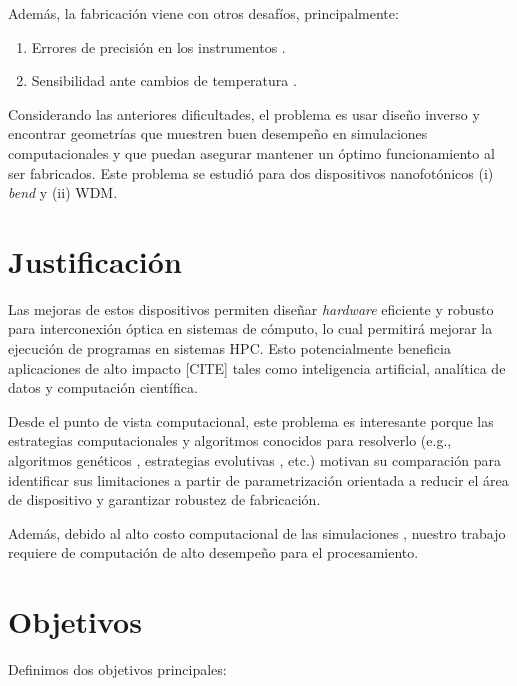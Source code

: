 Además, la fabricación viene con otros desafíos, principalmente:

\begin{enumerate}
  \item Errores de precisión en los instrumentos \citep{Piggott2017}.
  \item Sensibilidad ante cambios de temperatura \citep{Vuckovic2019}.
\end{enumerate}

Considerando las anteriores dificultades, el problema es usar diseño inverso y encontrar geometrías que muestren buen desempeño en simulaciones computacionales y que puedan asegurar mantener un óptimo funcionamiento al ser fabricados. 
Este problema se estudió para dos dispositivos nanofotónicos (i) \emph{bend} y (ii) WDM.

\section{Justificación}


Las mejoras de estos dispositivos permiten diseñar \emph{hardware} eficiente y robusto para interconexión óptica en sistemas de cómputo, lo cual permitirá mejorar la ejecución de programas en sistemas HPC. Esto potencialmente beneficia aplicaciones de alto impacto [CITE] tales como inteligencia artificial, analítica de datos y computación científica.

Desde el punto de vista computacional, 
este problema es interesante porque las estrategias computacionales y algoritmos conocidos para resolverlo
(e.g., algoritmos genéticos \citep{Mykel2019}, estrategias evolutivas \citep{Hansen2016}, etc.) motivan su comparación para identificar sus limitaciones a partir de parametrización orientada a reducir el área de dispositivo y garantizar robustez de fabricación.


Además, debido al alto costo computacional de las simulaciones \citep{Schneider2019}, nuestro trabajo requiere de computación de alto desempeño para el procesamiento.

\section{Objetivos}

Definimos dos objetivos principales:

